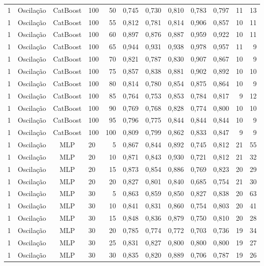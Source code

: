 \begin{longtable}{ccclrrrrrrrr}
1 & Oscilação & CatBoost & 100 & 50 & 0,745 & 0,730 & 0,810 & 0,783 & 0,797 & 11 & 13 \\
1 & Oscilação & CatBoost & 100 & 55 & 0,812 & 0,781 & 0,814 & 0,906 & 0,857 & 10 & 11 \\
1 & Oscilação & CatBoost & 100 & 60 & 0,897 & 0,876 & 0,887 & 0,959 & 0,922 & 10 & 11 \\
1 & Oscilação & CatBoost & 100 & 65 & 0,944 & 0,931 & 0,938 & 0,978 & 0,957 & 11 & 9 \\
1 & Oscilação & CatBoost & 100 & 70 & 0,821 & 0,787 & 0,830 & 0,907 & 0,867 & 10 & 9 \\
1 & Oscilação & CatBoost & 100 & 75 & 0,857 & 0,838 & 0,881 & 0,902 & 0,892 & 10 & 10 \\
1 & Oscilação & CatBoost & 100 & 80 & 0,814 & 0,780 & 0,854 & 0,875 & 0,864 & 10 & 9 \\
1 & Oscilação & CatBoost & 100 & 85 & 0,764 & 0,753 & 0,853 & 0,784 & 0,817 & 9 & 12 \\
1 & Oscilação & CatBoost & 100 & 90 & 0,769 & 0,768 & 0,828 & 0,774 & 0,800 & 10 & 10 \\
1 & Oscilação & CatBoost & 100 & 95 & 0,796 & 0,775 & 0,844 & 0,844 & 0,844 & 10 & 9 \\
1 & Oscilação & CatBoost & 100 & 100 & 0,809 & 0,799 & 0,862 & 0,833 & 0,847 & 9 & 9 \\
1 & Oscilação & MLP & 20 & 5 & 0,867 & 0,844 & 0,892 & 0,745 & 0,812 & 21 & 55 \\
1 & Oscilação & MLP & 20 & 10 & 0,871 & 0,843 & 0,930 & 0,721 & 0,812 & 21 & 32 \\
1 & Oscilação & MLP & 20 & 15 & 0,873 & 0,854 & 0,886 & 0,769 & 0,823 & 20 & 29 \\
1 & Oscilação & MLP & 20 & 20 & 0,827 & 0,801 & 0,840 & 0,685 & 0,754 & 21 & 30 \\
1 & Oscilação & MLP & 30 & 5 & 0,863 & 0,859 & 0,850 & 0,827 & 0,838 & 20 & 63 \\
1 & Oscilação & MLP & 30 & 10 & 0,841 & 0,831 & 0,860 & 0,754 & 0,803 & 20 & 41 \\
1 & Oscilação & MLP & 30 & 15 & 0,848 & 0,836 & 0,879 & 0,750 & 0,810 & 20 & 28 \\
1 & Oscilação & MLP & 30 & 20 & 0,785 & 0,774 & 0,772 & 0,703 & 0,736 & 19 & 34 \\
1 & Oscilação & MLP & 30 & 25 & 0,831 & 0,827 & 0,800 & 0,800 & 0,800 & 19 & 27 \\
1 & Oscilação & MLP & 30 & 30 & 0,835 & 0,820 & 0,889 & 0,706 & 0,787 & 19 & 26 \\

\end{longtable}
